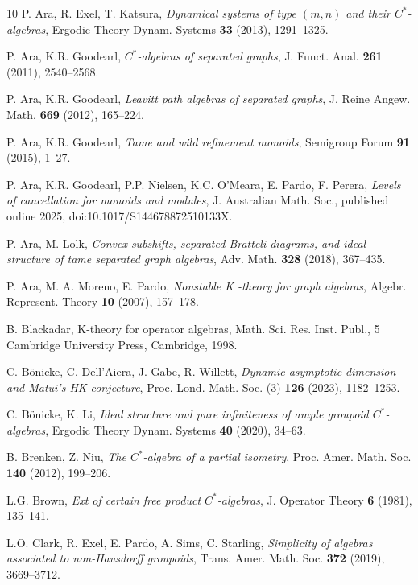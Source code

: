 \documentclass[11pt]{amsart}
\theoremstyle{plain}            %
\theoremstyle{definition}       %
\theoremstyle{definition}       %
\theoremstyle{remark}
\begin{document}
\begin{thebibliography}{10}
	 P. Ara, R. Exel, T. Katsura,
	\emph{Dynamical systems of type  $(m,n)$  and their  $C^*$-algebras},
	Ergodic Theory Dynam. Systems \textbf{33} (2013), 1291--1325.
	
	 P. Ara, K.R. Goodearl, \emph{$C^*$-algebras of separated graphs},
	J. Funct. Anal. \textbf{261} (2011), 2540--2568.
	
		P. Ara, K.R. Goodearl, \emph{Leavitt path algebras of separated graphs}, J. Reine Angew. Math. \textbf{669} (2012), 165--224.
	
	 P. Ara, K.R. Goodearl,
	\emph{Tame and wild refinement monoids}, Semigroup Forum \textbf{91} (2015),  1--27.

     P. Ara, K.R. Goodearl, P.P. Nielsen, K.C. O'Meara, E. Pardo, F. Perera, \emph{Levels of cancellation for monoids and modules}, J. Australian Math. Soc., published online 2025, doi:10.1017/S144678872510133X.
    
	P. Ara, M. Lolk, \emph{Convex subshifts, separated Bratteli diagrams, and ideal structure of tame separated graph algebras}, Adv. Math. \textbf{328} (2018), 367--435.
		
	 P. Ara, M. A. Moreno, E. Pardo, \emph{Nonstable  K -theory for graph algebras},
	Algebr. Represent. Theory \textbf{10} (2007), 157--178.
	

 B. Blackadar,
	K-theory for operator algebras,
	Math. Sci. Res. Inst. Publ., 5
	Cambridge University Press, Cambridge, 1998. 

 C. Bönicke, C. Dell'Aiera, J. Gabe, R. Willett,    
\emph{Dynamic asymptotic dimension and Matui's HK conjecture},
Proc. Lond. Math. Soc. (3) \textbf{126} (2023), 1182--1253.
    
	C. Bönicke, K. Li, \emph{Ideal structure and pure infiniteness of ample groupoid  $C^*$-algebras}, Ergodic Theory Dynam. Systems \textbf{40} (2020), 34--63.
	
	 B.	Brenken, Z. Niu, \emph{The $C^*$-algebra of a partial isometry}, Proc. Amer. Math. Soc. \textbf{140} (2012), 199--206.
	
	L.G. Brown, \emph{Ext of certain free product $C^*$-algebras}, J. Operator Theory \textbf{6} (1981), 135--141. 
	
	 L.O. Clark, R. Exel, E. Pardo, A. Sims, C. Starling, 
\emph{Simplicity of algebras associated to non-Hausdorff groupoids},
Trans. Amer. Math. Soc. \textbf{372} (2019), 3669--3712.


\end{thebibliography}
\end{document}
